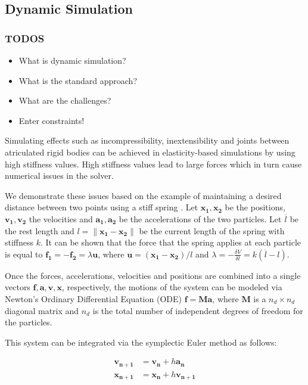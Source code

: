 \documentclass{article}
\begin{document}
\subsection*{Dynamic Simulation}
\subsubsection*{TODOS}
\begin{itemize}
    \item What is dynamic simulation?
    \item What is the standard approach?
    \item What are the challenges?
    \item Enter constraints!
\end{itemize}

Simulating effects such as incompressibility, inextensibility and joints between atriculated rigid bodies 
can be achieved in elasticity-based simulations by using high stiffness values. High stiffness values lead to 
large forces which in turn cause numerical issues in the solver. 

We demonstrate these issues based on the example of maintaining a desired distance between two points using a stiff 
spring \cite{tournier2015}. Let $\bm{x_1, x_2}$ be the positions, $\bm{v_1, v_2}$ the velocities and $\bm{a_1, a_2}$
be the accelerations of the two particles. Let $\overline{l}$ be the rest length and $l = \lVert \bm{x_1} - \bm{x_2} \rVert$ 
be the current length of the spring with stiffness $k$. It can be shown that the force that the spring applies at each particle
is equal to $\bm{f_1} = -\bm{f_2} = \lambda\bm{u}$, where $\bm{u} = (\bm{x_1} - \bm{x_2}) / l$
and $\lambda = -\frac{\delta V}{\delta l} = k(\overline{l} - l)$. 

Once the forces, accelerations, velocities and positions are combined into a single vectors $\bm{f}, \bm{a}, \bm{v}, \bm{x}$, 
respectively, the motions of the system can be modeled via Newton's Ordinary Differential Equation (ODE) $\bm{f} = \bm{Ma}$,
where $\bm{M}$ is a $n_d \times n_d$ diagonal matrix and $n_d$ is the total number of independent degrees of freedom for the 
particles.

This system can be integrated via the symplectic Euler method as follows:

\begin{align*}
    \bm{v_{n+1}} &= \bm{v_n} + h\bm{a_n} \\
    \bm{x_{n+1}} &= \bm{x_n} + h\bm{v_{n+1}}
\end{align*}
\end{document}
